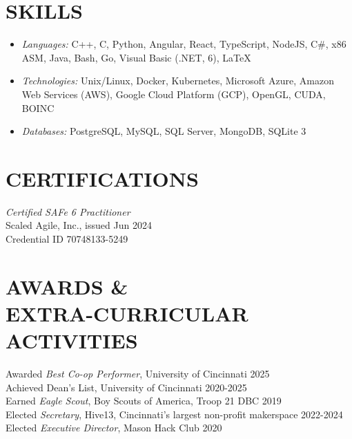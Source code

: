 \documentclass[margin]{res} %
\begin{document}
\begin{resume}
\section{SKILLS}

\begin{itemize}[leftmargin=0cm, label={}]
    \item {\sl Languages:} 
    C++, C, Python, Angular, React, TypeScript, NodeJS, C\#, x86 ASM, Java, Bash, Go, Visual Basic (.NET, 6), \LaTeX
    \item {\sl Technologies:} 
    Unix/Linux, Docker, Kubernetes, Microsoft Azure, Amazon Web Services (AWS), Google Cloud Platform (GCP), OpenGL, CUDA, BOINC
    \item {\sl Databases:} 
    PostgreSQL, MySQL, SQL Server, MongoDB, SQLite 3
\end{itemize}

\section{CERTIFI\-CATIONS}

{\sl Certified SAFe\textsuperscript{\tiny\textregistered} 6 Practitioner}\\
Scaled Agile, Inc., issued Jun 2024\\
Credential ID 70748133-5249




\section{AWARDS \& \\EXTRA-CURRICULAR \\ ACTIVITIES} 

Awarded {\it Best Co-op Performer}, University of Cincinnati \hfill 2025 \\
Achieved Dean's List, University of Cincinnati \hfill 2020-2025 \\
Earned {\it Eagle Scout}, Boy Scouts of America, Troop 21 DBC \hfill 2019 \\
Elected {\it Secretary}, Hive13, Cincinnati's largest non-profit makerspace \hfill 2022-2024\\
Elected {\it Executive Director}, Mason Hack Club \hfill 2020\\


\end{resume}
\end{document}
